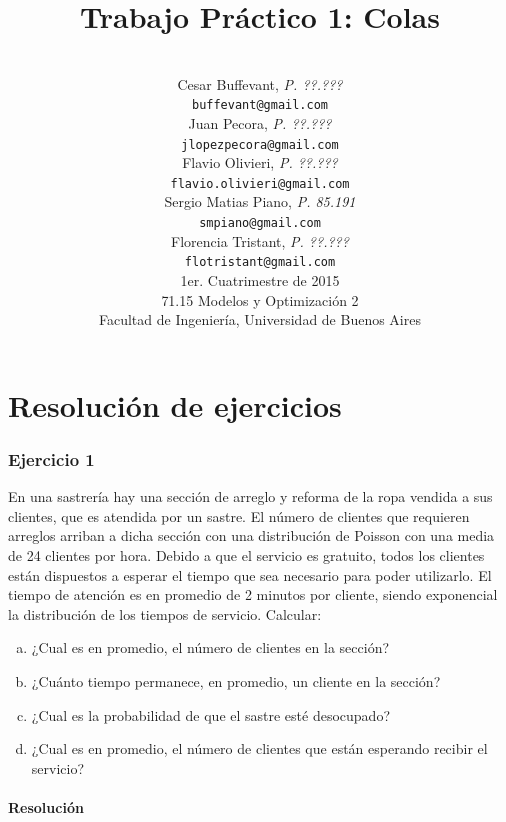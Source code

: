 \documentclass[a4paper,11pt]{article}
\title{\textbf{Trabajo Práctico 1: Colas}}
\author{\\
  Cesar Buffevant, \textit{P. ??.???}                              \\
  \texttt{buffevant@gmail.com}                                     \\ [2.5ex]
  Juan Pecora, \textit{P. ??.???}                                  \\
  \texttt{jlopezpecora@gmail.com}                                  \\ [2.5ex]
  Flavio Olivieri, \textit{P. ??.???}                              \\
  \texttt{flavio.olivieri@gmail.com}                               \\ [2.5ex]
  Sergio Matias Piano, \textit{P. 85.191}                          \\
  \texttt{smpiano@gmail.com}                                       \\ [2.5ex]
  Florencia Tristant, \textit{P. ??.???}                           \\
  \texttt{flotristant@gmail.com}                                   \\ [2.5ex]
  \normalsize{1er. Cuatrimestre de 2015}                           \\
  \normalsize{71.15 Modelos y Optimización 2}                      \\
  \normalsize{Facultad de Ingeniería, Universidad de Buenos Aires} \\
}
\date{}
\begin{document}
\thispagestyle{empty}
\maketitle

\clearpage

\tableofcontents
\clearpage

\part{Resolución de ejercicios}
\section*{\textbf{Ejercicio 1}}

\baselineskip=13pt
En una sastrería hay una sección de arreglo y reforma de la ropa vendida a sus
clientes, que es atendida por un sastre. El número de clientes que requieren
arreglos arriban a dicha sección con una distribución de Poisson con una media
de 24 clientes por hora. Debido a que el servicio es gratuito, todos los
clientes están dispuestos a esperar el tiempo que sea necesario para poder
utilizarlo. El tiempo de atención es en promedio de 2 minutos por cliente,
siendo exponencial la distribución de los tiempos de servicio. Calcular:

\leftskip=36pt
\parindent=-18pt
\begin{enumerate}[a)]
  \item ¿Cual es en promedio, el número de clientes en la sección?

  \item ¿Cuánto tiempo permanece, en promedio, un cliente en la sección?

  \item ¿Cual es la probabilidad de que el sastre esté desocupado?

  \item ¿Cual es en promedio, el número de clientes que están esperando recibir
    el servicio?
\end{enumerate}

\vspace{13pt}
\leftskip=0pt
\parindent=0pt
\subsection*{\textbf{Resolución}}
\end{document}
